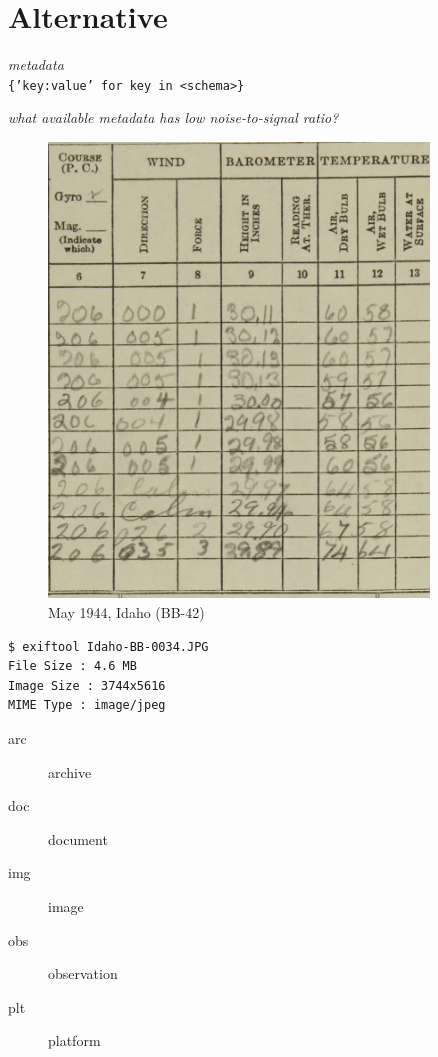 \documentclass[a0paper]{betterposter}
\begin{document}
{\section{Alternative}

  \begin{center}
    \textit{metadata}\\
    \texttt{\{'key:value' for key in <schema>\}}
  \end{center}
    \textit{what available metadata has low noise-to-signal ratio?}

\begin{minipage}[t]{0.5\linewidth}
    \begin{figure}
        \includegraphics[width=0.9\textwidth]{img/idaho-1944}
        \caption{
            May 1944, Idaho (BB-42)
        }
    \end{figure}
\end{minipage}
\begin{minipage}[t]{0.45\linewidth}
\hspace{2em}
\begin{verbatim}
$ exiftool Idaho-BB-0034.JPG 
File Size : 4.6 MB
Image Size : 3744x5616
MIME Type : image/jpeg
\end{verbatim}
        \begin{description}
            \item[arc] archive
            \item[doc] document
            \item[img] image
            \item[obs] observation
            \item[plt] platform
        \end{description}
\end{minipage}

}
\end{document}
